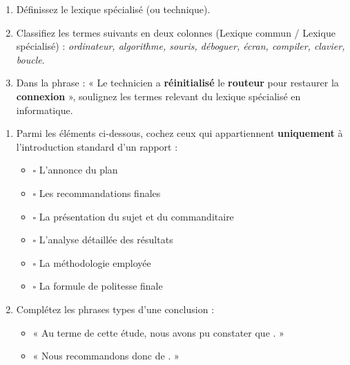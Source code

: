 \documentclass[11pt]{article}
\begin{document}
\begin{exercice}
\begin{enumerate}
    \item Définissez le lexique spécialisé (ou technique).
    \item Classifiez les termes suivants en deux colonnes (Lexique commun / Lexique spécialisé) : \textit{ordinateur, algorithme, souris, déboguer, écran, compiler, clavier, boucle}.
    \item Dans la phrase : « Le technicien a \textbf{réinitialisé} le \textbf{routeur} pour restaurer la \textbf{connexion} », soulignez les termes relevant du lexique spécialisé en informatique.
\end{enumerate}
\end{exercice}

\begin{exercice}
\begin{enumerate}
    \item Parmi les éléments ci-dessous, cochez ceux qui appartiennent \textbf{uniquement} à l'introduction standard d'un rapport :
    \begin{itemize}
        \item[] $\square$  L'annonce du plan
        \item[] $\square$  Les recommandations finales
        \item[] $\square$  La présentation du sujet et du commanditaire
        \item[] $\square$  L'analyse détaillée des résultats
        \item[] $\square$  La méthodologie employée
        \item[] $\square$  La formule de politesse finale
    \end{itemize}
    \item Complétez les phrases types d'une conclusion :
    \begin{itemize}
        \item « Au terme de cette étude, nous avons pu constater que \underline{\hspace{6cm}}. »
        \item « Nous recommandons donc de \underline{\hspace{6cm}}. »
    \end{itemize}
\end{enumerate}
\end{exercice}
\end{document}
